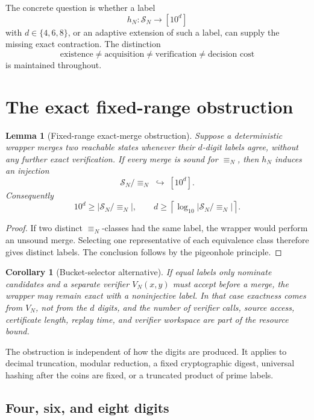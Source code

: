 \documentclass[11pt]{article}
\newtheorem{lemma}[theorem]{Lemma}
\newtheorem{corollary}[theorem]{Corollary}
\begin{document}
The concrete question is whether a label
\[
 h_N:\mathcal S_N\longrightarrow [10^d]
\]
with $d\in\{4,6,8\}$, or an adaptive extension of such a label, can supply
the missing exact contraction.  The distinction
\[
 \text{existence}\ne\text{acquisition}\ne
 \text{verification}\ne\text{decision cost}
\]
is maintained throughout.

\section{The exact fixed-range obstruction}

\begin{lemma}[Fixed-range exact-merge obstruction]\label{lem:fixed-range}
Suppose a deterministic wrapper merges two reachable states whenever their
$d$-digit labels agree, without any further exact verification.  If every
merge is sound for $\equiv_N$, then $h_N$ induces an injection
\[
 \mathcal S_N/\!\equiv_N\;\hookrightarrow\;[10^d].
\]
Consequently
\[
  10^d\ge \left|\mathcal S_N/\!\equiv_N\right|,
  \qquad
  d\ge
  \left\lceil\log_{10}\left|\mathcal S_N/\!\equiv_N\right|\right\rceil.
  \tag{1}
\]
\end{lemma}

\begin{proof}
If two distinct $\equiv_N$-classes had the same label, the wrapper would
perform an unsound merge.  Selecting one representative of each equivalence
class therefore gives distinct labels.  The conclusion follows by the
pigeonhole principle.
\end{proof}

\begin{corollary}[Bucket-selector alternative]\label{cor:selector}
If equal labels only nominate candidates and a separate verifier $V_N(x,y)$
must accept before a merge, the wrapper may remain exact with a noninjective
label.  In that case exactness comes from $V_N$, not from the $d$ digits, and
the number of verifier calls, source access, certificate length, replay time,
and verifier workspace are part of the resource bound.
\end{corollary}

The obstruction is independent of how the digits are produced.  It applies
to decimal truncation, modular reduction, a fixed cryptographic digest,
universal hashing after the coins are fixed, or a truncated product of prime
labels.

\subsection{Four, six, and eight digits}
\end{document}
